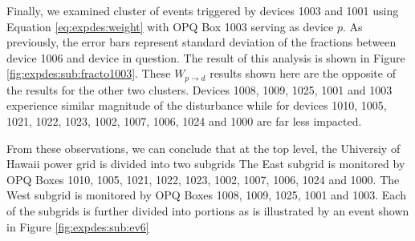 Finally, we examined cluster of events triggered by devices 1003 and 1001 using Equation \ref{eq:expdes:weight} with OPQ Box 1003 serving as device $p$.
As previously, the error bars represent standard deviation of the fractions between device 1006 and device in question.
The result of this analysis is shown in Figure \ref{fig:expdes:sub:fracto1003}.
These $W_{p \rightarrow d}$ results shown here are the opposite of the results for the other two clusters.
Devices 1008, 1009, 1025, 1001 and 1003 experience similar magnitude of the disturbance while for devices 1010, 1005, 1021, 1022, 1023, 1002, 1007, 1006, 1024 and 1000 are far less impacted.

From these observations, we can conclude that at the top level, the Uhiversiy of Hawaii power grid is divided into two subgrids
The East subgrid is monitored by OPQ Boxes 1010, 1005, 1021, 1022, 1023, 1002, 1007, 1006, 1024 and 1000.
The West subgrid is monitored by OPQ Boxes 1008, 1009, 1025, 1001 and 1003.
Each of the subgrids is further divided into portions as is illustrated by an event shown in Figure \ref{fig:expdes:sub:ev6}
